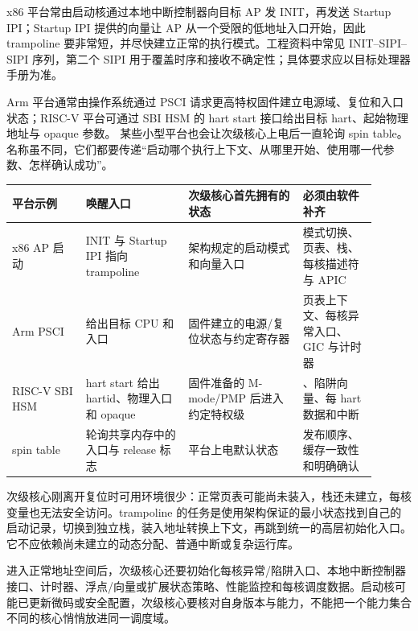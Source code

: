 
x86 平台常由启动核通过本地中断控制器向目标 AP 发 INIT，再发送 Startup IPI；Startup IPI 提供的向量让 AP 从一个受限的低地址入口开始，因此 trampoline 要非常短，并尽快建立正常的执行模式。工程资料中常见 INIT--SIPI--SIPI 序列，第二个 SIPI 用于覆盖时序和接收不确定性；具体要求应以目标处理器手册为准。\cite{intel-sdm}

Arm 平台通常由操作系统通过 PSCI  请求更高特权固件建立电源域、复位和入口状态；RISC-V 平台可通过 SBI HSM 的 hart start 接口给出目标 hart、起始物理地址与 opaque 参数。\cite{arm-psci,riscv-sbi-hsm} 某些小型平台也会让次级核心上电后一直轮询 spin table。名称虽不同，它们都要传递“启动哪个执行上下文、从哪里开始、使用哪一代参数、怎样确认成功”。

\begin{longtable}{L{0.18\linewidth}L{0.25\linewidth}L{0.29\linewidth}L{0.18\linewidth}}
\toprule
平台示例 & 唤醒入口 & 次级核心首先拥有的状态 & 必须由软件补齐 \\
\midrule
x86 AP 启动 & INIT 与 Startup IPI 指向 trampoline & 架构规定的启动模式和向量入口 & 模式切换、页表、栈、每核描述符与 APIC \\\tablerowrule
Arm PSCI &  给出目标 CPU 和入口 & 固件建立的电源/复位状态与约定寄存器 & 页表上下文、每核异常入口、GIC 与计时器 \\\tablerowrule
RISC-V SBI HSM & hart start 给出 hartid、物理入口和 opaque & 固件准备的 M-mode/PMP 后进入约定特权级 & 、陷阱向量、每 hart 数据和中断 \\\tablerowrule
spin table & 轮询共享内存中的入口与 release 标志 & 平台上电默认状态 & 发布顺序、缓存一致性和明确确认 \\
\bottomrule
\end{longtable}


次级核心刚离开复位时可用环境很少：正常页表可能尚未装入，栈还未建立，每核变量也无法安全访问。trampoline 的任务是使用架构保证的最小状态找到自己的启动记录，切换到独立栈，装入地址转换上下文，再跳到统一的高层初始化入口。它不应依赖尚未建立的动态分配、普通中断或复杂运行库。

进入正常地址空间后，次级核心还要初始化每核异常/陷阱入口、本地中断控制器接口、计时器、浮点/向量或扩展状态策略、性能监控和每核调度数据。启动核可能已更新微码或安全配置，次级核心要核对自身版本与能力，不能把一个能力集合不同的核心悄悄放进同一调度域。

